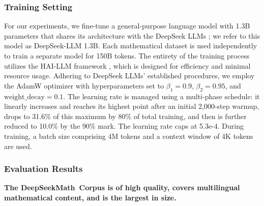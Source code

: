 \begin{itemize}[topsep=0pt]
\subsubsection{Training Setting}
\label{sec:quality-policy}
For our experiments, we fine-tune a general-purpose language model with 1.3B parameters that shares its architecture with the DeepSeek LLMs \citep{deepseek-llm}; we refer to this model as DeepSeek-LLM 1.3B. Each mathematical dataset is used independently to train a separate model for 150B tokens. The entirety of the training process utilizes the HAI-LLM framework \citep{haillm}, which is designed for efficiency and minimal resource usage. Adhering to DeepSeek LLMs’ established procedures, we employ the AdamW optimizer \citep{adamW} with hyperparameters set to $\beta_1=0.9$, $\beta_2=0.95$, and $\mathrm{weight\_decay}=0.1$. The learning rate is managed using a multi-phase schedule: it linearly increases and reaches its highest point after an initial 2,000-step warmup, drops to 31.6\% of this maximum by 80\% of total training, and then is further reduced to 10.0\% by the 90\% mark. The learning rate caps at 5.3e-4. During training, a batch size comprising 4M tokens and a context window of 4K tokens are used.

\subsubsection{Evaluation Results}

\textbf{The DeepSeekMath~Corpus is of high quality, covers multilingual mathematical content, and is the largest in size.}


\end{itemize}
